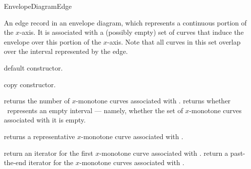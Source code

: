 
\ccRefPageBegin

\begin{ccRefConcept}{EnvelopeDiagramEdge}

\ccDefinition

An edge record in an envelope diagram, which represents a continuous portion
of the $x$-axis. It is associated with a (possibly empty) set of curves that
induce the envelope over this portion of the $x$-axis. Note that all curves
in this set overlap over the interval represented by the edge.

\ccTypes




\ccCreation
{}

    {default constructor.}
    
    {copy constructor.}

\ccAccessFunctions

    {returns the number of $x$-monotone curves associated with \ccVar.}
\ccGlue
{}
    {returns whether \ccVar\ represents an empty interval --- namely, whether the set of $x$-monotone curves associated with it is empty.}

    {returns a representative $x$-monotone curve associated with \ccVar.
     }

    {return an iterator for the first $x$-monotone curve associated with \ccVar.}
\ccGlue
{}
    {return a past-the-end iterator for the $x$-monotone curves associated with \ccVar.}


\end{ccRefConcept}
